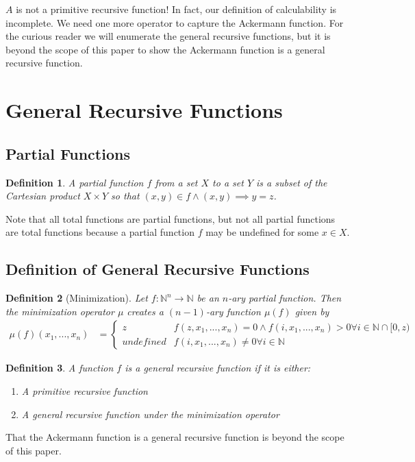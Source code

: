 \documentclass[12pt, letterpaper]{article}
\newtheorem*{definition}{Definition}
\theoremstyle{case}
\begin{document}
    $A$ is not a primitive recursive function! In fact, our definition of calculability is incomplete. We need one
    more operator to capture the Ackermann function. For the curious reader we will enumerate the general recursive functions,
    but it is beyond the scope of this paper to show the Ackermann function is a general recursive function.

  \section{General Recursive Functions}
    \subsection{Partial Functions}
      \begin{definition}
        A partial function $f$ from a set $X$ to a set $Y$ is a subset of the Cartesian product $X \times Y$ so that
        $(x, y) \in f \wedge (x, y) \implies y = z$.
      \end{definition}
      Note that all total functions are partial functions, but not all partial functions are total functions because
      a partial function $f$ may be undefined for some $x \in X$.
    \subsection{Definition of General Recursive Functions}
    \begin{definition}[Minimization]
      Let $f: \mathbb{N}^n \rightarrow \mathbb{N}$ be an $n$-ary partial function. Then the minimization operator $\mu$
      creates a $(n - 1)$-ary function $\mu(f)$ given by
      \begin{equation*}
        \begin{aligned}
          \mu(f)(x_1, ..., x_n) &=
          \begin{cases}
            z                       & f(z, x_1, ..., x_n) = 0 \wedge f(i, x_1, ..., x_n) > 0 \forall i \in \mathbb{N} \cap [0, z) \\
            undefined               & f(i, x_1, ..., x_n) \neq 0 \forall i \in \mathbb{N}
          \end{cases}
        \end{aligned}
      \end{equation*}
    \end{definition}
    \begin{definition}
      A function $f$ is a general recursive function if it is either:
      \begin{enumerate}
        \item A primitive recursive function
        \item A general recursive function under the minimization operator
      \end{enumerate}
    \end{definition}
  That the Ackermann function is a general recursive function is beyond the scope of this paper.
\end{document}
